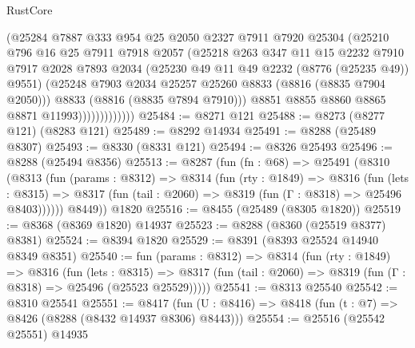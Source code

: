 \begin{lexlean}{RustCore}
\begin{coremodule}
                          (@25284
                            @7887
                            @333
                            @954
                            @25
                            @2050
                            @2327
                            @7911
                            @7920
                            @25304
                            (@25210
                              @796
                              @16
                              @25
                              @7911
                              @7918
                              @2057
                              (@25218
                                @263
                                @347
                                @11
                                @15
                                @2232
                                @7910
                                @7917
                                @2028
                                @7893
                                @2034
                                (@25230 @49 @11 @49 @2232 (@8776 (@25235 @49)) @9551)
                                (@25248 @7903 @2034 @25257 @25260 @8833 (@8816 (@8835 @7904 @2050)))
                                @8833
                                (@8816 (@8835 @7894 @7910)))
                              @8851
                              @8855
                              @8860
                              @8865
                              @8871
                              @11993)))))))))))))
@25484 := @8271 @121
@25488 := @8273 (@8277 @121) (@8283 @121)
@25489 := @8292 @14934
@25491 := @8288 (@25489 @8307)
@25493 := @8330 (@8331 @121)
@25494 := @8326 @25493
@25496 := @8288 (@25494 @8356)
@25513 := @8287
    (fun (fn : @68) =>
    @25491
      (@8310
        (@8313
          (fun (params : @8312) =>
          @8314
            (fun (rty : @1849) =>
            @8316
              (fun (lets : @8315) =>
              @8317 (fun (tail : @2060) => @8319 (fun (Γ : @8318) => @25496 @8403))))))
        @8449))
    @1820
@25516 := @8455 (@25489 (@8305 @1820))
@25519 := @8368 (@8369 @1820) @14937
@25523 := @8288 (@8360 (@25519 @8377) @8381)
@25524 := @8394 @1820
@25529 := @8391 (@8393 @25524 @14940 @8349 @8351)
@25540 := fun (params : @8312) =>
  @8314
    (fun (rty : @1849) =>
    @8316
      (fun (lets : @8315) =>
      @8317 (fun (tail : @2060) => @8319 (fun (Γ : @8318) => @25496 (@25523 @25529)))))
@25541 := @8313 @25540
@25542 := @8310 @25541
@25551 := @8417
    (fun (U : @8416) => @8418 (fun (t : @7) => @8426 (@8288 (@8432 @14937 @8306) @8443)))
@25554 := @25516 (@25542 @25551) @14935

\end{coremodule}
\end{lexlean}
